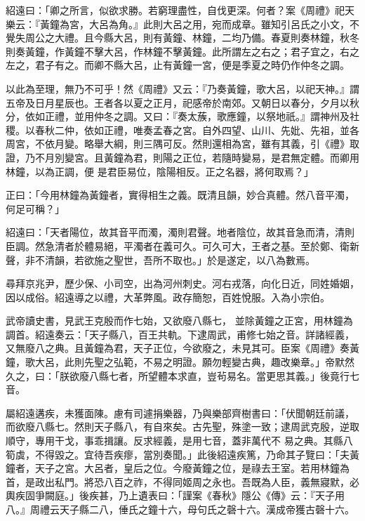 \begin{pinyinscope}
 紹遠曰：「卿之所言，似欲求勝。若窮理盡性，自伐更深。何者？案《周禮》祀天樂云：『黃鐘為宮，大呂為角。』此則大呂之用，宛而成章。雖知引呂氏之小文，不覺失周公之大禮。且今縣大呂，則有黃鐘、林鐘，二均乃備。春夏則奏林鐘，秋冬則奏黃鐘，作黃鐘不擊大呂，作林鐘不擊黃鐘。此所謂左之右之；君子宜之，右之
 左之，君子有之。而卿不縣大呂，止有黃鐘一宮，便是季夏之時仍作仲冬之調。



 以此為至理，無乃不可乎！然《周禮》又云：『乃奏黃鐘，歌大呂，以祀天神。』謂五帝及日月星辰也。王者各以夏之正月，祀感帝於南郊。又朝日以春分，夕月以秋分，依如正禮，並用仲冬之調。又曰：『奏太蔟，歌應鐘，以祭地祇。』謂神州及社稷。以春秋二仲，依如正禮，唯奏孟春之宮。自外四望、山川、先妣、先祖，並各周宮，不依月變。略舉大綱，則三隅可反。然則還相為宮，雖有其義，引《禮》取證，乃不月別變宮。且黃鐘為君，則陽之正位，若隨時變易，是君無定體。而卿用林鐘，以為正調，便
 是君臣易位，陰陽相反。正之名器，將何取焉？」



 正曰：「今用林鐘為黃鐘者，實得相生之義。既清且韻，妙合真體。然八音平濁，何足可稱？」



 紹遠曰：「天者陽位，故其音平而濁，濁則君聲。地者陰位，故其音急而清，清則臣調。然急清者於體易絕，平濁者在義可久。可久可大，王者之基。至於鄭、衛新聲，非不清韻，若欲施之聖世，吾所不取也。」於是遂定，以八為數焉。



 尋拜京兆尹，歷少保、小司空，出為河州刺史。河右戎落，向化日近，同姓婚姻，因以成俗。紹遠導之以禮，大革弊風。政存簡恕，百姓悅服。入為小宗伯。



 武帝讀史書，見武王克殷而作七始，又欲廢八縣七，
 並除黃鐘之正宮，用林鐘為調首。紹遠奏云：「天子縣八，百王共軌。下逮周武，甫修七始之音。詳諸經義，又無廢八之典。且黃鐘為君，天子正位，今欲廢之，未見其可。臣案《周禮》奏黃鐘，歌大呂，此則先聖之弘範，不易之明證。願勿輕變古典，趣改樂章。」帝默然久之，曰：「朕欲廢八縣七者，所望體本求直，豈茍易名。當更思其義。」後竟行七音。



 屬紹遠遘疾，未獲面陳。慮有司遽捐樂器，乃與樂部齊樹書曰：「伏聞朝廷前議，而欲廢八縣七。然則天子縣八，有自來矣。古先聖，殊塗一致；逮周武克殷，逆取順守，專用干戈，事乖揖讓。反求經義，是用七音，蓋非萬代不
 易之典。其縣八筍虡，不得毀之。宜待吾疾瘳，當別奏聞。」此後紹遠疾篤，乃命其子覽曰：「夫黃鐘者，天子之宮。大呂者，皇后之位。今廢黃鐘之位，是祿去王室。若用林鐘為首，是政出私門。將恐八百之祚，不得同姬周之永也。吾既為人臣，義無寢默，必輿疾固爭闕庭。」後疾甚，乃上遺表曰：「謹案《春秋》隱公《傳》云：『天子用八。』周禮云天子縣二八，倕氏之鐘十六，母句氏之磬十六。漢成帝獲古磬十六。




\end{pinyinscope}
